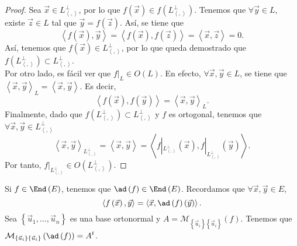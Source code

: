 \begin{proof}
Sea $\displaystyle \vec{x} \in L^{\perp }_{\left\langle ,  \right\rangle } $, por lo que $\displaystyle f\left(\vec{x}\right) \in f\left(L^{\perp }_{\left\langle ,  \right\rangle }\right) $. Tenemos que $\displaystyle \forall\vec{y} \in L $, existe $\displaystyle \vec{z} \in L $ tal que $\displaystyle \vec{y} = f\left(\vec{z}\right) $. Así, se tiene que 
\[\left\langle f\left(\vec{x}\right), \vec{y} \right\rangle = \left\langle f\left(\vec{x}\right), f\left(\vec{z}\right) \right\rangle = \left\langle \vec{x}, \vec{z} \right\rangle = 0 .\]
Así, tenemos que $\displaystyle f\left(\vec{x}\right) \in L^{\perp }_{\left\langle ,  \right\rangle } $, por lo que queda demostrado que $\displaystyle f\left(L^{\perp }_{\left\langle ,  \right\rangle }\right) \subset L^{\perp }_{\left\langle ,  \right\rangle }$. \\
Por otro lado, es fácil ver que $\displaystyle f|_{L} \in O\left(L\right) $. En efecto, $\displaystyle \forall \vec{x}, \vec{y} \in L $, se tiene que $\displaystyle \left\langle \vec{x}, \vec{y} \right\rangle _{L} = \left\langle \vec{x}, \vec{y} \right\rangle  $. Es decir,
\[\left\langle f\left(\vec{x}\right), f\left(\vec{y}\right) \right\rangle = \left\langle \vec{x}, \vec{y} \right\rangle _{L} .\]
Finalmente, dado que $\displaystyle f\left(L^{\perp }_{\left\langle ,  \right\rangle }\right) \subset L^{\perp }_{\left\langle ,  \right\rangle } $ y $\displaystyle f $ es ortogonal, tenemos que $\displaystyle \forall\vec{x}, \vec{y} \in L^{\perp }_{\left\langle ,  \right\rangle } $ 
\[\left\langle \vec{x}, \vec{y} \right\rangle _{L^{\perp }_{\left\langle ,  \right\rangle }} = \left\langle \vec{x}, \vec{y} \right\rangle = \left\langle f|_{L^{\perp }_{\left\langle ,  \right\rangle }}\left(\vec{x}\right), f|_{L^{\perp }_{\left\langle ,  \right\rangle }}\left(\vec{y}\right) \right\rangle  .\]
Por tanto, $\displaystyle f|_{L^{\perp }_{\left\langle ,  \right\rangle }} \in O\left(L^{\perp }_{\left\langle ,  \right\rangle }\right) $.
\end{proof}
Si $\displaystyle f \in \End\left(E\right) $, tenemos que $\displaystyle \ad\left(f\right) \in \End\left(E\right) $. Recordamos que $\displaystyle \forall \vec{x}, \vec{y} \in E $,
\[\left\langle f\left(\vec{x}\right), \vec{y} \right\rangle  = \left\langle \vec{x}, \ad\left(f\right)\left(\vec{y}\right) \right\rangle  .\]
Sea $\displaystyle \left\{ \vec{u}_{1}, \ldots, \vec{u}_{n}\right\}  $ es una base ortonormal y $\displaystyle A = \mathcal{M}_{ \left\{ \vec{u}_{i}\right\} \left\{ \vec{u}_{i}\right\} }\left(f\right) $. Tenemos que $\displaystyle \mathcal{M}_{ \left\{ \vec{u}_{i}\right\} \left\{ \vec{u}_{i}\right\} }\left(\ad\left(f\right)\right) = A^{t} $.
